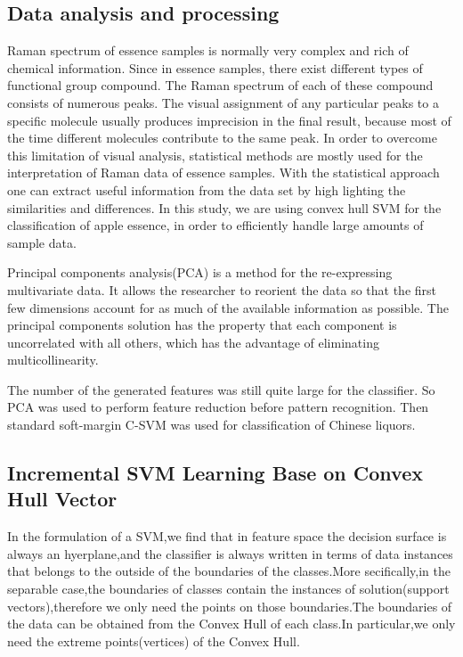\documentclass[a4paper]{article}
\begin{document}
\subsection{Data analysis and processing}%
Raman  spectrum  of  essence samples  is  normally  very  complex  and  rich  of  chemical information.  Since  in essence  samples,  there  exist  different  types  of  functional group compound. The Raman spectrum of each of these compound consists of  numerous peaks.  The  visual  assignment  of  any  particular  peaks  to  a  specific  molecule usually  produces  imprecision  in  the  final  result,  because  most  of  the  time  different molecules  contribute  to  the  same  peak.  In  order  to  overcome  this  limitation  of  visual analysis, statistical methods are mostly used for the interpretation of Raman data of essence samples. With the statistical approach one can extract useful information from the data set by high  lighting  the  similarities  and differences.  In  this  study,  we  are using convex hull SVM  for  the  classification of  apple essence,  in order to efficiently handle large amounts of sample data.

Principal components analysis(PCA)  is  a  method  for  the  re-expressing  multivariate  data.   It  allows  the researcher to reorient the data so that the first few dimensions account for as much  of  the  available  information  as  possible.  The  principal  components solution has the property that each component is uncorrelated with all others, which  has  the  advantage  of  eliminating  multicollinearity.

The number of the generated features was still quite large for  the  classifier.  So  PCA  was  used  to  perform  feature reduction  before  pattern  recognition.  Then  standard soft-margin  C-SVM  was  used  for  classification  of  Chinese liquors.

\subsection{Incremental SVM Learning Base on Convex Hull Vector}
In the formulation of a SVM,we find that in feature space the decision surface is always an hyerplane,and the classifier is always written in terms of data instances that belongs to the outside of the boundaries of the classes.More secifically,in the separable case,the boundaries of classes contain the instances of solution(support vectors),therefore we only need the points on those boundaries.The boundaries of the data can be obtained from the Convex Hull of each class.In particular,we only need the extreme points(vertices) of the Convex Hull.
\end{document}
